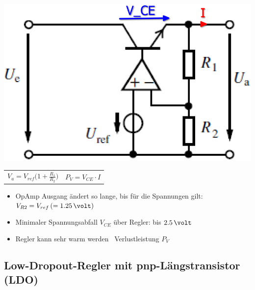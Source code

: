 \begin{minipage}[c]{0.3\columnwidth}
    \includegraphics[width=\columnwidth]{images/linearer_spannungsregler.png}
\end{minipage}
\hfill
\begin{minipage}[c]{0.68\columnwidth}
    \begin{tabular}{c c}
        $ \boxed{ V_a = V_{ref} \Big( 1 + \frac{R_1}{R_2} \Big) } $ & $ \boxed{ P_V = V_{CE} \cdot I} $
    \end{tabular}
    \begin{itemize}
        \item OpAmp Ausgang ändert so lange, bis für die Spannungen gilt: $V_{R2} = V_{ref} \, (=1.25 \, \volt)$
        \item Minimaler Spannungsabfall $V_{CE}$ über Regler: bis $2.5 \, \volt$
        \item Regler kann sehr warm werden \textrightarrow\ Verlustleistung $P_V$
    \end{itemize}
\end{minipage}


\subsection{Low-Dropout-Regler mit pnp-Längstransistor (LDO)}


